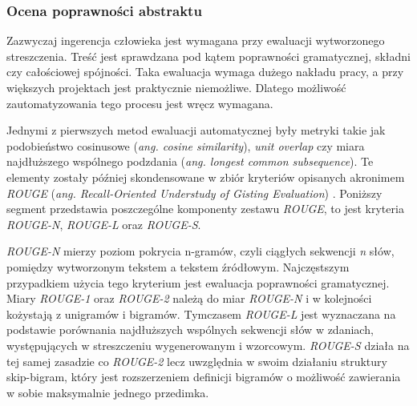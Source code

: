 \documentclass[12pt,a4paper,twoside]{article}
\begin{document}
\subsubsection{Ocena poprawności abstraktu}
Zazwyczaj ingerencja człowieka jest wymagana przy ewaluacji wytworzonego streszczenia. Treść jest sprawdzana pod kątem poprawności gramatycznej, składni czy całościowej spójności. Taka ewaluacja wymaga dużego nakładu pracy, a przy większych projektach jest praktycznie niemożliwe. Dlatego możliwość zautomatyzowania tego procesu jest wręcz wymagana.\par
Jednymi z pierwszych metod ewaluacji automatycznej były metryki takie jak podobieństwo cosinusowe (\textit{ang. cosine similarity}), \textit{unit overlap} czy miara najdłuższego wspólnego podzdania (\textit{ang. longest common subsequence}). Te elementy zostały później skondensowane w zbiór kryteriów opisanych akronimem \textit{ROUGE} (\textit{ang. Recall-Oriented Understudy of Gisting Evaluation}) \cite{rouge}. Poniższy segment przedstawia poszczególne komponenty zestawu \textit{ROUGE}, to jest kryteria \textit{ROUGE-N}, \textit{ROUGE-L} oraz \textit{ROUGE-S}.\par
\textit{ROUGE-N} mierzy poziom pokrycia n-gramów, czyli ciągłych sekwencji \textit{n} słów, pomiędzy wytworzonym tekstem a tekstem źródłowym. Najczęstszym przypadkiem użycia tego kryterium jest ewaluacja poprawności gramatycznej. Miary \textit{ROUGE-1} oraz \textit{ROUGE-2} należą do miar \textit{ROUGE-N} i w kolejności kożystają z unigramów i bigramów.
Tymczasem \textit{ROUGE-L} jest wyznaczana na podstawie porównania najdłuższych wspólnych sekwencji słów w zdaniach, występujących w streszczeniu wygenerowanym i wzorcowym. \textit{ROUGE-S} działa na tej samej zasadzie co \textit{ROUGE-2} lecz uwzględnia w swoim działaniu struktury skip-bigram, który jest rozszerzeniem definicji bigramów o możliwość zawierania w sobie maksymalnie jednego przedimka.
\end{document}
